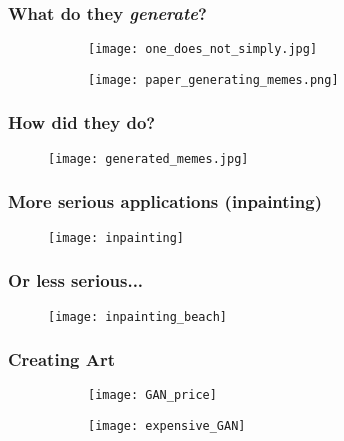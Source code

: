 \documentclass[aspectratio=149]{beamer}
\begin{document}
\begin{frame}
  \frametitle{What do they \emph{generate}?}
    \begin{figure}[ht]
      \centering
      \begin{subfigure}[c]{.45\textwidth}
        \texttt{[image: one\_does\_not\_simply.jpg]}
      \end{subfigure}
      \begin{subfigure}[c]{.52\textwidth}
        \texttt{[image: paper\_generating\_memes.png]}
      \end{subfigure}
    \end{figure}
\end{frame}



\begin{frame}
  \frametitle{How did they do?}
  \begin{figure}[ht]
    \centering
    \texttt{[image: generated\_memes.jpg]}
  \end{figure}
\end{frame}


\begin{frame}
  \frametitle{More serious applications (inpainting)}
  \begin{figure}[ht]
    \centering
    \texttt{[image: inpainting]}
  \end{figure}
\end{frame}


\begin{frame}
  \frametitle{Or less serious...}

    \begin{figure}[ht]
      \centering
      \texttt{[image: inpainting\_beach]}
    \end{figure}
\end{frame}

\begin{frame}
  \frametitle{Creating Art}

    \begin{figure}[ht]
      \centering
      \begin{subfigure}[c]{.47\textwidth}
        \texttt{[image: GAN\_price]}
      \end{subfigure}
      \begin{subfigure}[c]{.47\textwidth}
        \texttt{[image: expensive\_GAN]}
      \end{subfigure}
    \end{figure}
\end{frame}
\end{document}
